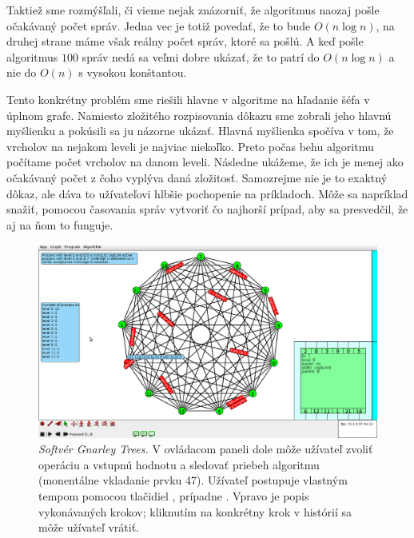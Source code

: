 Taktiež sme rozmýšľali, či vieme nejak znázorniť, že algoritmus naozaj pošle očakávaný počet správ.
Jedna vec je totiž povedať, že to bude $O(n\log n)$, na druhej strane máme však reálny počet správ,
ktoré sa pošlú. A keď pošle algoritmus $100$ správ nedá sa veľmi dobre ukázať, že to patrí do $O(n
\log n)$ a nie do $O(n)$ s vysokou konštantou.

Tento konkrétny problém sme riešili hlavne v algoritme na hľadanie šéfa v úplnom grafe. Namiesto
zložitého rozpisovania dôkazu sme zobrali jeho hlavnú myšlienku a pokúsili sa ju názorne ukázať.
Hlavná myšlienka spočíva v tom, že vrcholov na nejakom leveli je najviac niekoľko. Preto počas behu
algoritmu počítame počet vrcholov na danom leveli. Následne ukážeme, že ich je menej ako očakávaný
počet z čoho vyplýva daná zložitosť. Samozrejme nie je to exaktný dôkaz, ale dáva to užívateľovi
hlbšie pochopenie na príkladoch. Môže sa napríklad snažiť, pomocou časovania správ vytvoriť čo
najhorší prípad, aby sa
presvedčil, že aj na ňom to funguje.

\noindent
\begin{figure}
\centering
\includegraphics[width=2.01\columnwidth]{LE.png}
\caption{\emph{Softvér Gnarley Trees.} V ovládacom paneli dole môže užívateľ
zvoliť operáciu a vstupnú hodnotu a sledovať priebeh algoritmu (monentálne vkladanie
prvku 47). Užívateľ postupuje vlastným tempom  pomocou tlačidiel , prípadne
. Vpravo je popis vykonávaných krokov; kliknutím na konkrétny krok v histórií
sa môže užívateľ vrátiť.}
\label{img:historia} 
\end{figure}
